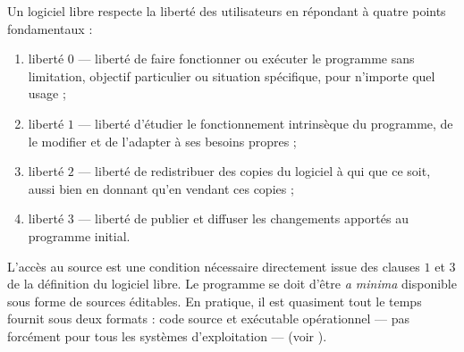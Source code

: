 Un logiciel libre respecte la liberté des utilisateurs en répondant à quatre points fondamentaux :
\begin{enumerate}
	\item liberté $0$ --- liberté de faire fonctionner ou exécuter le programme sans limitation, objectif particulier ou situation spécifique, pour n'importe quel usage ;
	\item liberté $1$ --- liberté d'étudier le fonctionnement intrinsèque du programme, de le modifier et de l'adapter à ses besoins propres ; 
	\item liberté $2$ --- liberté de redistribuer des copies du logiciel à qui que ce soit, aussi bien en donnant qu'en vendant ces copies ;
	\item liberté $3$ --- liberté de publier et diffuser les changements apportés au programme initial.
	\vspace*{0.5ex}
\end{enumerate}

L'accès au \gls{source} est une condition nécessaire directement is\-sue des clauses $1$ et $3$ de la définition du logiciel libre. Le programme se doit d'être \textit{a minima} disponible sous forme de sources éditables. En pratique, il est quasiment tout le temps fournit sous deux formats : code source et exécutable opérationnel --- pas forcément pour tous les systèmes d'exploitation --- (voir ).


